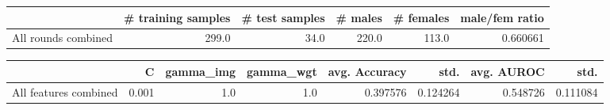 \begin{tabular}{lrrrrr}
\hline
{} &  \# training samples &  \# test samples &  \# males &  \# females &  male/fem ratio \\
\hline
All rounds combined &               299.0 &            34.0 &    220.0 &      113.0 &        0.660661 \\
\hline
\end{tabular}
\begin{tabular}{lrrrrrrr}
\hline
{} &      C &  gamma\_img &  gamma\_wgt &  avg. Accuracy &      std. &  avg. AUROC &      std. \\
\hline
All features combined &  0.001 &        1.0 &        1.0 &       0.397576 &  0.124264 &    0.548726 &  0.111084 \\
\hline
\end{tabular}
